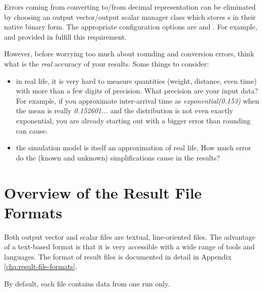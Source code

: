 Errors coming from converting to/from decimal representation can be
eliminated by choosing an output vector/output scalar manager class
which stores s in their native binary form.
The appropriate configuration options are 
and . For example,
 and 
provided in  fulfill this requirement.

However, before worrying too much about rounding and conversion errors,
think what is the \textit{real} accuracy of your results.
Some things to consider:

\begin{itemize}
  \item{in real life, it is very hard to measure quantities (weight, distance,
     even time) with more than a few digits of precision. What precision
     are your input data? For example, if you approximate inter-arrival
     time as \textit{exponential(0.153)} when the mean is really
     \textit{0.152601...} and the distribution is not even exactly exponential,
     you are already starting out with a bigger error than rounding can cause.}

  \item{the simulation model is itself an approximation of real life. How much
     error do the (known and unknown) simplifications cause in the results?}
\end{itemize}



\section{Overview of the Result File Formats}

Both output vector and scalar files are textual, line-oriented files.
The advantage of a text-based format is that it is very accessible
with a wide range of tools and languages. The format of result files is
documented in detail in Appendix \ref{cha:result-file-formats}.


By default, each file contains data from one run only.

